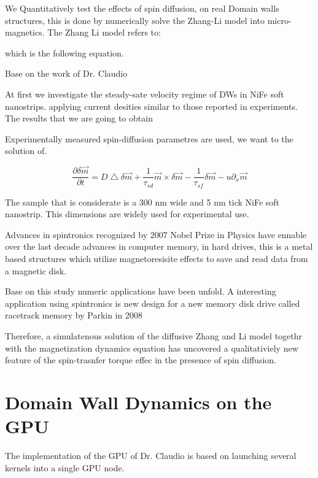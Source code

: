 
We Quantitatively test the effects of spin diffusion, on real Domain walls structures, this is done by numerically solve the Zhang-Li model \cite{zhang} into micro-magnetics.
The Zhang Li model refers to:

which is the following equation.

Base on the work of Dr. Claudio \cite{claudio}

At first we investigate the steady-sate velocity regime of DWs in NiFe soft nanostrips. applying current desities similar to those reported in experiments. The results that we are going to obtain 

Experimentally measured spin-diffusion parametres are used, we want to the solution of. 

\begin{equation}
 \frac{\partial \delta \vec{m} }{\partial t} =  D\bigtriangleup \delta \vec{m} + \frac{1}{\tau_{sd}} \vec{m} \times \delta  \vec{m} - \frac{1}{\tau_{sf}}\delta \vec{m} - u \partial_{x}  \vec{m}
\end{equation}


The sample that is considerate is a 300 nm wide and 5 nm tick NiFe soft nanostrip. This dimensions are widely used for experimental use.


Advances in spintronics recognized by 2007 Nobel Prize in Physics have ennable over the last decade advances in computer memory, in hard drives, this is a metal based structures which utilize magnetoresisite effects to save and read data from a magnetic disk. \cite{handbookspin} 


Base on this study numeric applications have been unfold. A interesting application using spintronics is new design for a new memory disk drive called racetrack memory by  Parkin in 2008\cite{racetrack}


Therefore, a simulatenous solution of the diffusive Zhang and Li model togethr with the magnetization dynamics equation has uncovered a qualitativiely new feature of the spin-trasnfer torque effec in the presence of spin diffusion.


\section{Domain Wall Dynamics on the GPU}


The implementation of the GPU of Dr. Claudio is based on launching several kernels into a single GPU node.


